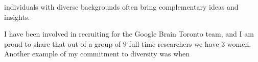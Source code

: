 \documentclass[10pt]{article}
\begin{document}
individuals with diverse backgrounds often bring complementary ideas
and insights. 

I have been involved in recruiting for the Google Brain
Toronto team, and I am proud to share that out of a group of $9$ full
time researchers we have $3$ women. Another example of my commitment
to diversity was when


\vspace{0.5cm}
\end{document}
